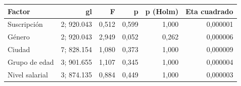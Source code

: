 \begin{tabular}{lrrrrr}
\toprule
Factor & gl & F & p & p (Holm) & Eta cuadrado \\
\midrule
Suscripción & 2; 920.043 & 0,512 & 0,599 & 1,000 & 0,000001 \\
Género & 2; 920.043 & 2,949 & 0,052 & 0,262 & 0,000006 \\
Ciudad & 7; 828.154 & 1,080 & 0,373 & 1,000 & 0,000009 \\
Grupo de edad & 3; 901.655 & 1,107 & 0,345 & 1,000 & 0,000004 \\
Nivel salarial & 3; 874.135 & 0,884 & 0,449 & 1,000 & 0,000003 \\
\bottomrule
\end{tabular}
